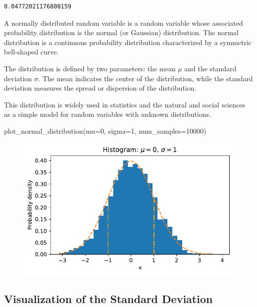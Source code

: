 \documentclass[
  letterpaper,
  DIV=11,
  numbers=noendperiod]{scrreprt}
\newenvironment{Shaded}{\begin{snugshade}}{\end{snugshade}}
\newcommand{\DecValTok}[1]{\textcolor[rgb]{0.68,0.00,0.00}{#1}}
\newcommand{\NormalTok}[1]{\textcolor[rgb]{0.00,0.23,0.31}{#1}}
\newcommand{\OperatorTok}[1]{\textcolor[rgb]{0.37,0.37,0.37}{#1}}
\begin{document}
\begin{verbatim}
0.04772021176800159
\end{verbatim}

A normally distributed random variable is a random variable whose
associated probability distribution is the normal (or Gaussian)
distribution. The normal distribution is a continuous probability
distribution characterized by a symmetric bell-shaped curve.

The distribution is defined by two parameters: the mean \(\mu\) and the
standard deviation \(\sigma\). The mean indicates the center of the
distribution, while the standard deviation measures the spread or
dispersion of the distribution.

This distribution is widely used in statistics and the natural and
social sciences as a simple model for random variables with unknown
distributions.

\begin{Shaded}
\begin{Highlighting}[]
\NormalTok{plot\_normal\_distribution(mu}\OperatorTok{=}\DecValTok{0}\NormalTok{, sigma}\OperatorTok{=}\DecValTok{1}\NormalTok{, num\_samples}\OperatorTok{=}\DecValTok{10000}\NormalTok{)}
\end{Highlighting}
\end{Shaded}

\begin{figure}[H]

{\centering \includegraphics{006_num_gp_files/figure-pdf/cell-20-output-1.pdf}

}

\end{figure}

\hypertarget{visualization-of-the-standard-deviation}{%
\subsection{Visualization of the Standard
Deviation}\label{visualization-of-the-standard-deviation}}
\end{document}
